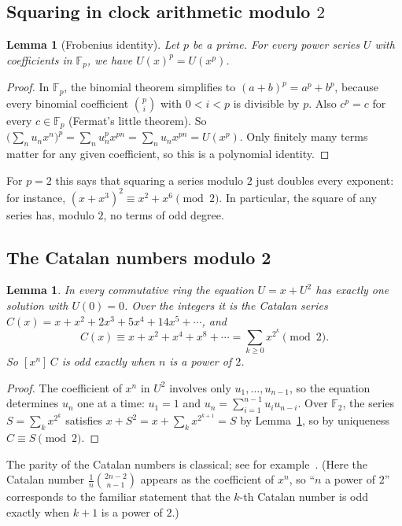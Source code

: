 \documentclass[11pt,a4paper]{article}
\newtheorem{lemma}[theorem]{Lemma}
\theoremstyle{definition}
\theoremstyle{remark}
\newcommand{\F}{\mathbb{F}}
\newcommand{\coeff}[2]{[x^{#1}]\,#2}
\begin{document}
\subsection{Squaring in clock arithmetic modulo \texorpdfstring{$2$}{2}}
\begin{lemma}[Frobenius identity]\label{lem:frobenius}
Let $p$ be a prime. For every power series $U$ with coefficients in $\F_p$, we have $U(x)^p=U(x^p)$.
\end{lemma}

\begin{proof}
In $\F_p$, the binomial theorem simplifies to $(a+b)^p=a^p+b^p$, because every binomial coefficient
$\binom pi$ with $0<i<p$ is divisible by $p$. Also $c^p=c$ for every $c\in\F_p$ (Fermat's little theorem). So
$\bigl(\sum_nu_nx^n\bigr)^p=\sum_nu_n^px^{pn}=\sum_nu_nx^{pn}=U(x^p)$. Only finitely many terms matter for any given
coefficient, so this is a polynomial identity.
\end{proof}

For $p=2$ this says that squaring a series modulo $2$ just doubles every exponent: for instance,
$(x+x^3)^2\equiv x^2+x^6\pmod2$. In particular, the square of any series has, modulo $2$, no terms of odd degree.

\subsection{The Catalan numbers modulo 2}
\begin{lemma}\label{lem:catalan}
In every commutative ring the equation $U=x+U^2$ has exactly one solution with $U(0)=0$. Over the integers it is the
Catalan series $C(x)=x+x^2+2x^3+5x^4+14x^5+\cdots$, and
\[
C(x)\equiv x+x^2+x^4+x^8+\cdots=\sum_{k\ge0}x^{2^k}\pmod 2 .
\]
So $\coeff{n}{C}$ is odd exactly when $n$ is a power of $2$.
\end{lemma}

\begin{proof}
The coefficient of $x^n$ in $U^2$ involves only $u_1,\dots,u_{n-1}$, so the equation determines $u_n$ one at a time:
$u_1=1$ and $u_n=\sum_{i=1}^{n-1}u_iu_{n-i}$. Over $\F_2$, the series $S=\sum_kx^{2^k}$ satisfies
$x+S^2=x+\sum_kx^{2^{k+1}}=S$ by Lemma~\ref{lem:frobenius}, so by uniqueness $C\equiv S\pmod2$.
\end{proof}
The parity of the Catalan numbers is classical; see for example~\cite{deutschsagan}. (Here the Catalan number
$\frac1{n}\binom{2n-2}{n-1}$ appears as the coefficient of $x^n$, so ``$n$ a power of $2$'' corresponds to the familiar
statement that the $k$-th Catalan number is odd exactly when $k+1$ is a power of $2$.)
\end{document}
